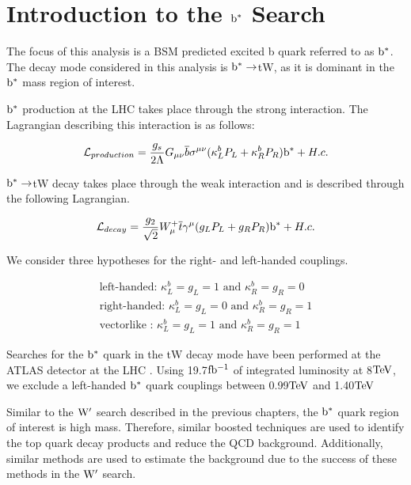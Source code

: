 \chapter{Introduction to the $\mathrm{b}^{*}$ Search}
\label{sec:bsintroduction}

The focus of this analysis is a BSM predicted \cite{Tait:2000sh} excited b quark referred to as $\mathrm{b}^{*}$.  
The decay mode considered in this analysis is $\mathrm{b}^{*} \to $tW, as it is dominant in the $\mathrm{b}^{*}$ mass region of interest.

$\mathrm{b}^{*}$ production at the LHC takes place through the strong interaction.  The Lagrangian describing this interaction is as follows: 

\begin{eqnarray}
{\cal L}_{production} = \frac{g_s}{2\Lambda}G_{\mu\nu} \overline{b} \sigma^{\mu\nu} (\kappa^{b}_{L}P_L + \kappa^{b}_{R}P_R)\bs + H.c.
\label{eqn:Lag1}
\end{eqnarray}

$\mathrm{b}^{*} \to $tW decay takes place through the weak interaction and is described through the following Lagrangian. 

\begin{eqnarray}
{\cal L}_{decay} = \frac{g_2}{\sqrt{2}}W^{+}_{\mu} \overline{t} \gamma^{\mu}(g_{L}P_L + g_{R}P_R)\bs + H.c.
\label{eqn:Lag2}
\end{eqnarray}

We consider three hypotheses for the right- and left-handed couplings.

\begin{eqnarray}
\text{left-handed: }\kappa^{b}_{L}=g_{L}=1 \text{ and } \kappa^{b}_{R}=g_{R}=0 \\
\text{right-handed: }\kappa^{b}_{L}=g_{L}=0 \text{ and } \kappa^{b}_{R}=g_{R}=1 \\
\text{vectorlike : }\kappa^{b}_{L}=g_{L}=1 \text{ and } \kappa^{b}_{R}=g_{R}=1 
\label{eqn:couplings}
\end{eqnarray}

Searches for the $\mathrm{b}^{*}$ quark in the tW decay mode have been performed at the ATLAS detector at the LHC \cite{Aad:2013rna}.  
Using 19.7$\mathrm{fb^{-1}}$ of integrated luminosity at 8$\mathrm{TeV}$, we exclude a left-handed $\mathrm{b}^{*}$ quark couplings between 0.99$\mathrm{TeV}$ and 1.40$\mathrm{TeV}$  

Similar to the $\mathrm{W}^{\prime}$ search described in the previous chapters, the $\mathrm{b}^{*}$ quark region of interest is high mass.  
Therefore, similar boosted techniques are used to identify the top quark decay products and reduce the QCD background.  
Additionally, similar methods are used to estimate the background due to the success of these methods in the $\mathrm{W}^{\prime}$ search.  

